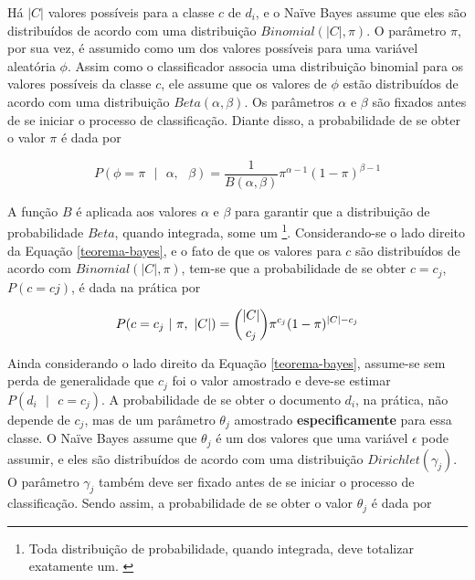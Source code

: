 

Há \ensuremath{|C|} valores possíveis para a classe \ensuremath{c} de \ensuremath{d_i}, e o Naïve Bayes assume que eles são distribuídos de acordo com uma distribuição \ensuremath{Binomial(|C|, \pi)}. O parâmetro \ensuremath{\pi}, por sua vez, é assumido como um dos valores possíveis para uma variável aleatória \ensuremath{\phi}. Assim como o classificador associa uma distribuição binomial para os valores possíveis da classe \ensuremath{c}, ele assume que os valores de \ensuremath{\phi} estão distribuídos de acordo com uma distribuição \ensuremath{Beta(\alpha, \beta)}. Os parâmetros \ensuremath{\alpha} e \ensuremath{\beta} são fixados antes de se iniciar o processo de classificação. Diante disso, a probabilidade de se obter o valor \ensuremath{\pi} é dada por  \cite{resnik}

\begin{equation}
\label{beta}
\ensuremath{P(\phi = \pi\mbox{ }|\mbox{ } \alpha,\mbox{ }\beta) = \frac{1}{B(\alpha, \beta)}\pi^{\alpha - 1}(1 - \pi)^{\beta - 1}}
\end{equation}

A função \ensuremath{B} é aplicada aos valores \ensuremath{\alpha} e \ensuremath{\beta} para garantir que a distribuição de probabilidade \ensuremath{Beta}, quando integrada, some um \cite{stat-distribs}\footnote{Toda distribuição de probabilidade, quando integrada, deve totalizar exatamente um. \cite{stat-distribs}}. Considerando-se o lado direito da Equação \ref{teorema-bayes}, e o fato de que os valores para \ensuremath{c} são distribuídos de acordo com \ensuremath{Binomial(|C|, \pi)}, tem-se que a probabilidade de se obter \ensuremath{c = c_j}, \ensuremath{P(c = cj)}, é dada na prática por \cite{resnik}

\begin{equation}
\label{binomial}
\ensuremath{P(c = c_j\mbox{ } |\mbox{ } \pi,\mbox{ } |C|) =  \dbinom{|C|}{c_j}\pi^{c_j}(1 - \pi)^{|C| - c_j}}
\end{equation}


Ainda considerando o lado direito da Equação \ref{teorema-bayes}, assume-se sem perda de generalidade que \ensuremath{c_j} foi o valor amostrado e deve-se estimar \ensuremath{P(d_i\mbox{ } |\mbox{ } c = c_j)}. A probabilidade de se obter o documento \ensuremath{d_i}, na prática, não depende de \ensuremath{c_j}, mas de um parâmetro \ensuremath{\theta_j} amostrado \textbf{especificamente} para essa classe. O Naïve Bayes assume que \ensuremath{\theta_j} é um dos valores que uma variável \ensuremath{\epsilon} pode assumir, e eles são distribuídos de acordo com uma distribuição \ensuremath{Dirichlet(\gamma_j)}. O parâmetro \ensuremath{\gamma_j} também deve ser fixado antes de se iniciar o processo de classificação. Sendo assim, a probabilidade de se obter o valor \ensuremath{\theta_j} é dada por \cite{resnik}


